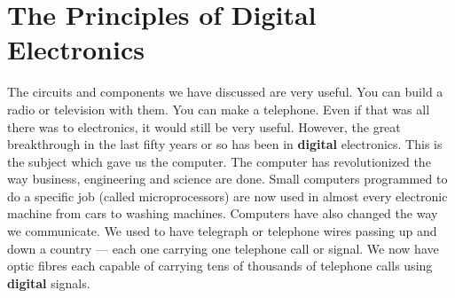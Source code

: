 \section{The Principles of Digital Electronics}

The circuits and components we have discussed are very useful.  You can build a radio or television with them.  You can make a telephone.  Even if that was all there was to electronics, it would still be very useful.  However, the great breakthrough in the last fifty years or so has been in {\bf digital} electronics.  This is the subject which gave us the computer.  The computer has revolutionized the way business, engineering and science are done.  Small computers programmed to do a specific job (called microprocessors) are now used in almost every electronic machine from cars to washing machines.  Computers have also changed the way we communicate.  We used to have telegraph or telephone wires passing up and down a country --- each one carrying one telephone call or signal.  We now have optic fibres each capable of carrying tens of thousands of telephone calls using {\bf digital} signals.


